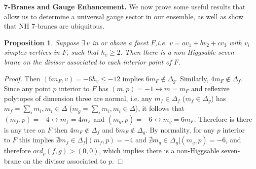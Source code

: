 \documentclass[aps,prl,twocolumn, superscriptaddress,groupedaddress,nofootinbib]{revtex4-1}
\newtheorem{prop}{Proposition}
\begin{document}

\vspace{.2cm}
\noindent \textbf{7-Branes and Gauge Enhancement.}
We now prove some useful results that allow us to determine a universal gauge sector in our ensemble, as well as show that NH 7-branes are ubiquitous.
\begin{prop}
\label{prop:NH7fromsingletree}
Suppose $\exists \, v $ in or above a facet $F$,i.e. $v=av_1+bv_2+cv_3$ with $v_i$ simplex vertices in $F$, such that $h_v\geq 2$. Then there is a non-Higgsable seven-brane on the divisor associated
to each interior point of $F$.
\end{prop}

\begin{proof}
Then $(6 m_F,v)=-6h_v \leq -12$ implies $6m_F \notin \Delta_g$.
Similarly, $4m_F \notin \Delta_f$. Since any point $p$ interior to $F$ has 
$(m,p)=-1 \leftrightarrow m=m_F$ and reflexive polytopes of dimension three
are normal, i.e. any $m_f\in \Delta_f$ ($m_f \in \Delta_g$) has
$m_f = \sum_i m_i, m_i\in \Delta$ ($m_g = \sum_i m_i, m_i\in \Delta$),
it follows that $(m_f,p)=-4 \leftrightarrow m_f = 4m_F$ and $(m_g,p)=-6 \leftrightarrow m_g = 6m_F$. Therefore is there is any tree on $F$
then $4m_F \notin \Delta_f$ and $6m_F\notin \Delta_g$. By normality,
for any $p$ interior to $F$ this implies
$\nexists m_f \in \Delta_f | (m_f,p)=-4$ and
$\nexists m_g \in \Delta_g | (m_g,p)=-6$, and therefore $ord_p(f,g) > (0,0)$,
which implies there is a non-Higgsable seven-brane on the divisor associated to $p$.
\end{proof}
\end{document}
